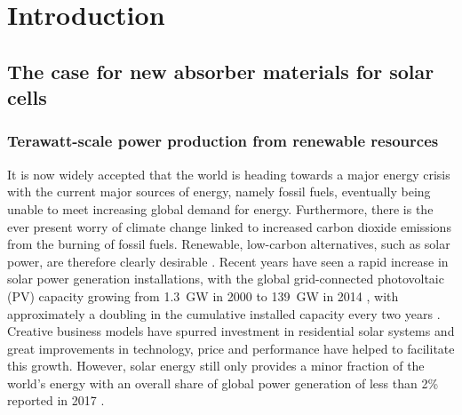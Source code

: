 \documentclass[11pt, twoside]{report}
\begin{document}
\chapter{Introduction}
\setcounter{page}{1}

\section{The case for new absorber materials for solar cells}

\subsection{Terawatt-scale power production from renewable resources}

It is now widely accepted that the world is heading towards a major energy crisis with the current major sources of energy, namely fossil fuels, eventually being unable to meet increasing global demand for energy. Furthermore, there is the ever present worry of climate change linked to increased carbon dioxide emissions from the burning of fossil fuels. Renewable, low-carbon alternatives, such as solar power, are therefore clearly desirable \cite{PV_for_climate_change}. 
Recent years have seen a rapid increase in solar power generation installations, with the global grid-connected photovoltaic (PV) capacity growing from \SI{1.3}{GW} in 2000 to \SI{139}{GW} in 2014 \cite{pathways_129}, with approximately a doubling in the cumulative installed capacity every two years \cite{pathways}. Creative business models have spurred investment in residential solar systems \cite{MIT} and great improvements in technology, price and performance have helped to facilitate this growth. However, solar energy still only provides a minor fraction of the world's energy with an overall share of global power generation of less than 2\% reported in 2017 \cite{bp_solar}. %
\end{document}
